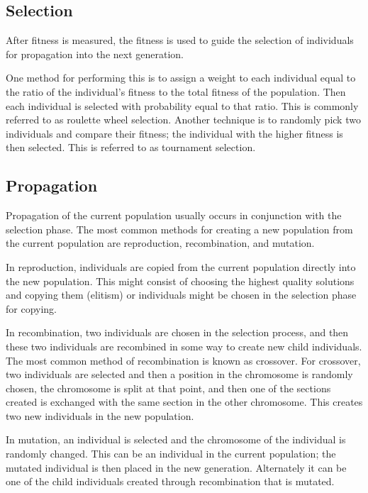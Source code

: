 \subsection{Selection}

After fitness is measured, the fitness is used to guide the selection of
individuals for propagation into the next generation. 

One method for performing this is to assign a weight to each individual
equal to the ratio of the individual's fitness to the total fitness of the
population. Then each individual is selected with probability equal to that
ratio. This is commonly referred to as roulette wheel selection. Another
technique is to randomly pick two individuals and compare their fitness; the
individual with the higher fitness is then selected. This is referred to as
tournament selection. 

\subsection{Propagation}

Propagation of the current population usually occurs in conjunction with the
selection phase. The most common methods for creating a new population from the
current population are reproduction, recombination, and mutation.

In reproduction, individuals are copied from the current population directly
into the new population. This might consist of choosing the highest quality
solutions and copying them (elitism) or individuals might be chosen in the
selection phase for copying.

In recombination, two individuals are chosen in the selection process, and then
these two individuals are recombined in some way to create new child
individuals. The most common method of recombination is known as crossover. For
crossover, two individuals are selected and then a position in the chromosome is
randomly chosen, the chromosome is split at that point, and then one of the
sections created is exchanged with the same section in the other chromosome.
This creates two new individuals in the new population.

In mutation, an individual is selected and the chromosome of the individual is
randomly changed. This can be an individual in the current population; the
mutated individual is then placed in the new generation. Alternately it can be
one of the child individuals created through recombination that is mutated.

